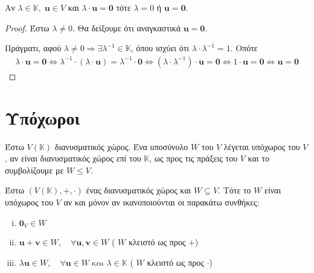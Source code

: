 \begin{prop} \label{prop:prod}
\item {}
    Αν $ \lambda \in \mathbb{K}, \; \mathbf{u} \in V $ και $ \lambda \cdot \mathbf{u} =
    \mathbf{0} $ τότε $ \lambda = 0 $ ή $ \mathbf{u} = \mathbf{0} $. 
\end{prop}

\begin{proof}
\item {}
    Έστω $ \lambda \neq 0 $. Θα δείξουμε ότι αναγκαστικά $ \mathbf{u} = \mathbf{0} $. 

    Πράγματι, αφού $ \lambda \neq 0 \Rightarrow \exists \lambda ^{-1} \in \mathbb{K} $, 
    όπου ισχύει ότι $ \lambda \cdot \lambda ^{-1} = 1 $. Οπότε 
    \begin{gather*}
        \lambda \cdot \mathbf{u} = \mathbf{0} \Leftrightarrow 
        \lambda ^{-1}\cdot (\lambda \cdot \mathbf{u}) = \lambda ^{-1} \cdot \mathbf{0}
        \Leftrightarrow 
        (\lambda \cdot \lambda ^{-1}) \cdot \mathbf{u} = \mathbf{0} \Leftrightarrow 
        1 \cdot \mathbf{u} = \mathbf{0} \Leftrightarrow 
        \mathbf{u} = \mathbf{0} 
    \end{gather*} 
\end{proof}



\section{Υπόχωροι}


\begin{dfn}
\item {}
    Έστω $V(\mathbb{K}) $ διανυσματικός χώρος. Ένα υποσύνολο $W$ του $V$ λέγεται 
    \textcolor{Col2}{υπόχωρος} του $ V $, αν είναι διανυσματικός χώρος επί του 
    $ \mathbb{K} $, ως προς τις πράξεις του $V$ και το συμβολίζουμε με $ W \leq V $.
\end{dfn}



\begin{prop}
    \label{prop:subsp}
\item {}
    Έστω $ (V(\mathbb{K}),+,\cdot) $ ένας διανυσματικός χώρος και $ W \subseteq V $.  
    Τότε το $ W $ είναι υπόχωρος του $V$ αν και μόνον αν ικανοποιούνται οι 
    παρακάτω συνθήκες:
    \begin{enumerate}[i)]
        \item $ \mathbf{0}_{V} \in W $
        \item $ \mathbf{u}+ \mathbf{v} \in W, \quad \forall \mathbf{u}, 
            \mathbf{v} \in W $ \quad ( $W$ κλειστό ως προς $ + $)
        \item $ \lambda \mathbf{u} \in W, \quad \forall \mathbf{u} \in W \; 
            \text{και} \; \lambda \in \mathbb{K} $ \quad ( $W$ κλειστό ως προς 
            $ \cdot $)
    \end{enumerate}
\end{prop}

